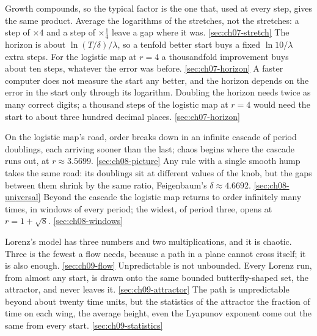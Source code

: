 %
  {Growth compounds, so the typical factor is the one that, used at every step, gives the same product. Average the logarithms of the stretches, not the stretches: a step of $\times 4$ and a step of $\times \tfrac14$ leave a gap where it was.}%
  {\ref{sec:ch07-stretch}}
%
  {The horizon is about $\ln(T/\delta)/\lambda$, so a tenfold better start buys a fixed $\ln 10/\lambda$ extra steps. For the logistic map at $r = 4$ a thousandfold improvement buys about ten steps, whatever the error was before.}%
  {\ref{sec:ch07-horizon}}
%
  {A faster computer does not measure the start any better, and the horizon depends on the error in the start only through its logarithm. Doubling the horizon needs twice as many correct digits; a thousand steps of the logistic map at $r = 4$ would need the start to about three hundred decimal places.}%
  {\ref{sec:ch07-horizon}}

%
  {On the logistic map's road, order breaks down in an infinite cascade of period doublings, each arriving sooner than the last; chaos begins where the cascade runs out, at $r \approx \num{3.5699}$.}%
  {\ref{sec:ch08-picture}}
%
  {Any rule with a single smooth hump takes the same road: its doublings sit at different values of the knob, but the gaps between them shrink by the same ratio, Feigenbaum's $\delta \approx \num{4.6692}$.}%
  {\ref{sec:ch08-universal}}
%
  {Beyond the cascade the logistic map returns to order infinitely many times, in windows of every period; the widest, of period three, opens at $r = 1 + \sqrt{8}$.}%
  {\ref{sec:ch08-windows}}

%
  {Lorenz's model has three numbers and two multiplications, and it is chaotic. Three is the fewest a flow needs, because a path in a plane cannot cross itself; it is also enough.}%
  {\ref{sec:ch09-flow}}
%
  {Unpredictable is not unbounded. Every Lorenz run, from almost any start, is drawn onto the same bounded butterfly-shaped set, the attractor, and never leaves it.}%
  {\ref{sec:ch09-attractor}}
%
  {The path is unpredictable beyond about twenty time units, but the statistics of the attractor \dash{} the fraction of time on each wing, the average height, even the Lyapunov exponent \dash{} come out the same from every start.}%
  {\ref{sec:ch09-statistics}}

